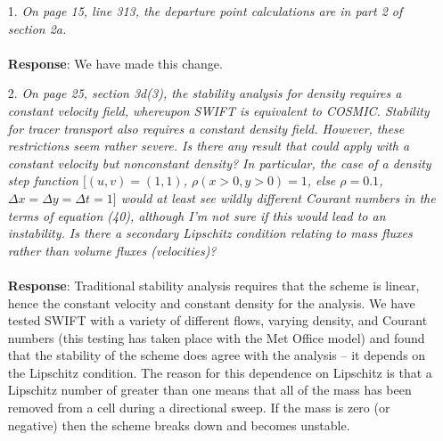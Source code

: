 \documentclass[11pt,a4paper]{article}
\begin{document}
\begin{enumerate}[leftmargin=*]
\item[1.] \textit{On page 15, line 313, the departure point calculations are in part 2 of section 2a.} \\
\\
\textbf{Response}: We have made this change.

\item[2.] \textit{On page 25, section 3d(3), the stability analysis for density requires a constant velocity field, whereupon SWIFT is equivalent to COSMIC.  Stability for tracer transport also requires a constant density field.  However, these restrictions seem rather severe.  Is there any result that could apply with a constant velocity but nonconstant density?  In particular, the case of a density step function $[(u,v) = (1,1)$, $\rho(x>0, y>0) = 1$, else $\rho=0.1$, $\Delta x=\Delta y=\Delta t=1]$ would at least see wildly different Courant numbers in the terms of equation (40), although I'm not sure if this would lead to an instability.  Is there a secondary Lipschitz condition relating to mass fluxes rather than volume fluxes (velocities)?} \\
\\
\textbf{Response}: Traditional stability analysis requires that the scheme is linear, hence the constant velocity and constant density for the analysis. We have tested SWIFT with a variety of different flows, varying density, and Courant numbers (this testing has taken place with the Met Office model) and found that the stability of the scheme does agree with the analysis -- it depends on the Lipschitz condition. The reason for this dependence on Lipschitz is that a Lipschitz number of greater than one means that all of the mass has been removed from a cell during a directional sweep. If the mass is zero (or negative) then the scheme breaks down and becomes unstable. 

\end{enumerate}
\end{document}
